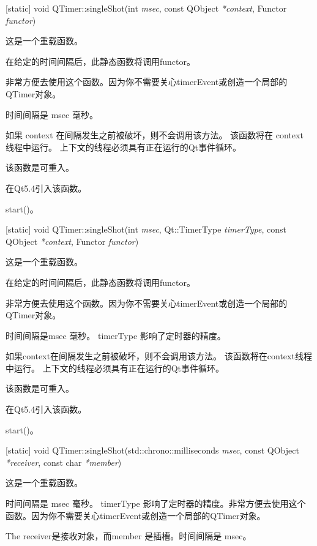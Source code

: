 [static] void QTimer::singleShot(int \emph{msec}, const QObject \emph{*context}, Functor \emph{functor})

这是一个重载函数。

在给定的时间间隔后，此静态函数将调用functor。

非常方便去使用这个函数。因为你不需要关心timerEvent或创造一个局部的QTimer对象。

时间间隔是 msec 毫秒。

如果 context 在间隔发生之前被破坏，则不会调用该方法。 该函数将在 context 线程中运行。 上下文的线程必须具有正在运行的Qt事件循环。

\begin{notice}
该函数是可重入。
\end{notice}

在Qt5.4引入该函数。

\begin{seeAlso}
start()。
\end{seeAlso}

[static] void QTimer::singleShot(int \emph{msec}, Qt::TimerType \emph{timerType}, const QObject \emph{*context}, Functor \emph{functor})

这是一个重载函数。

在给定的时间间隔后，此静态函数将调用functor。

非常方便去使用这个函数。因为你不需要关心timerEvent或创造一个局部的QTimer对象。

时间间隔是msec 毫秒。 timerType 影响了定时器的精度。

如果context在间隔发生之前被破坏，则不会调用该方法。 该函数将在context线程中运行。 上下文的线程必须具有正在运行的Qt事件循环。

\begin{notice}
该函数是可重入。
\end{notice}

在Qt5.4引入该函数。

\begin{seeAlso}
start()。
\end{seeAlso}

[static] void QTimer::singleShot(std::chrono::milliseconds \emph{msec}, const QObject \emph{*receiver}, const char \emph{*member})

这是一个重载函数。

时间间隔是 msec 毫秒。 timerType 影响了定时器的精度。非常方便去使用这个函数。因为你不需要关心timerEvent或创造一个局部的QTimer对象。

The receiver是接收对象，而member 是插槽。时间间隔是 msec。

